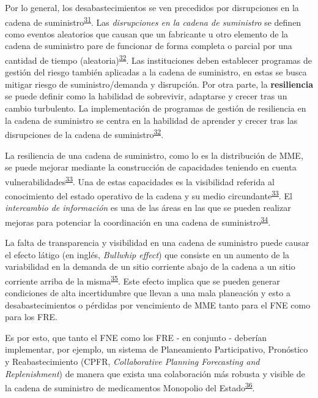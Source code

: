\documentclass[
]{book}
\begin{document}
Por lo general, los desabastecimientos se ven precedidos por disrupciones en la cadena de suministro\textsuperscript{\protect\hyperlink{ref-FDA2014}{31}}. Las \emph{disrupciones en la cadena de suministro} se definen como eventos aleatorios que causan que un fabricante u otro elemento de la cadena de suministro pare de funcionar de forma completa o parcial por una cantidad de tiempo (aleatoria)\textsuperscript{\protect\hyperlink{ref-Barbosa-Povoa2019}{32}}. Las instituciones deben establecer programas de gestión del riesgo también aplicadas a la cadena de suministro, en estas se busca mitigar riesgo de suministro/demanda y disrupción. Por otra parte, la \textbf{resiliencia} se puede definir como la habilidad de sobrevivir, adaptarse y crecer tras un cambio turbulento. La implementación de programas de gestión de resiliencia en la cadena de suministro se centra en la habilidad de aprender y crecer tras las disrupciones de la cadena de suministro\textsuperscript{\protect\hyperlink{ref-Barbosa-Povoa2019}{32}}.

La resiliencia de una cadena de suministro, como lo es la distribución de MME, se puede mejorar mediante la construcción de capacidades teniendo en cuenta vulnerabilidades\textsuperscript{\protect\hyperlink{ref-Pettit2013}{33}}. Una de estas capacidades es la visibilidad referida al conocimiento del estado operativo de la cadena y su medio circundante\textsuperscript{\protect\hyperlink{ref-Pettit2013}{33}}. El \emph{intercambio de información} es una de las áreas en las que se pueden realizar mejoras para potenciar la coordinación en una cadena de suministro\textsuperscript{\protect\hyperlink{ref-Silver2017}{34}}.

La falta de transparencia y visibilidad en una cadena de suministro puede causar el efecto látigo (en inglés, \emph{Bullwhip effect}) que consiste en un aumento de la variabilidad en la demanda de un sitio corriente abajo de la cadena a un sitio corriente arriba de la misma\textsuperscript{\protect\hyperlink{ref-Cachon2007}{35}}. Este efecto implica que se pueden generar condiciones de alta incertidumbre que llevan a una mala planeación y esto a desabastecimientos o pérdidas por vencimiento de MME tanto para el FNE como para los FRE.

Es por esto, que tanto el FNE como los FRE - en conjunto - deberían implementar, por ejemplo, un sistema de Planeamiento Participativo, Pronóstico y Reabastecimiento (CPFR, \emph{Collaborative Planning Forecasting and Replenishment}) de manera que exista una colaboración más robusta y visible de la cadena de suministro de medicamentos Monopolio del Estado\textsuperscript{\protect\hyperlink{ref-Hollmann2015}{36}}.
\end{document}
